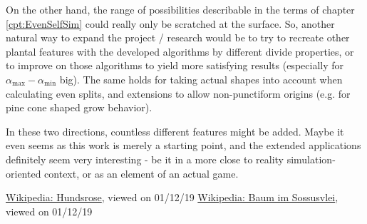\documentclass[11pt]{scrartcl}
\begin{document}
On the other hand, the range of possibilities describable in the terms of chapter \ref{cpt:EvenSelfSim} could really only be scratched at the surface. So, another natural way to expand the project / research would be to try to recreate other plantal features with the developed algorithms by different divide properties, or to improve on those algorithms to yield more satisfying results (especially for $\alpha_\text{max} - \alpha_\text{min}$ big). The same holds for taking actual shapes into account when calculating even splits, and extensions to allow non-punctiform origins (e.g. for pine cone shaped grow behavior).

In these two directions, countless different features might be added. Maybe it even seems as this work is merely a starting point, and the extended applications definitely seem very interesting - be it in a more close to reality simulation-oriented context, or as an element of an actual game.

\begin{thebibliography}{9}
	  \href{https://de.wikipedia.org/wiki/Rosen#/media/File:Hundsrose.jpg}{Wikipedia: Hundsrose}, viewed on 01/12/19
	  \href{https://upload.wikimedia.org/wikipedia/commons/a/a5/Baum_im_Sossusvlei.jpg}{Wikipedia: Baum im Sossusvlei}, viewed on 01/12/19
\end{thebibliography}
\end{document}
